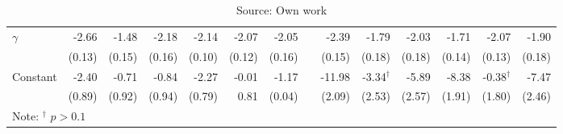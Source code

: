 \begin{table} [H]
\begin{tabular}{lrrrrrrrrrrrrr}
$\gamma$ & -2.66  & -1.48  & -2.18  & -2.14  & -2.07  & -2.05  && -2.39   & -1.79   & -2.03   & -1.71   & -2.07   & -1.90 \\ 
         & (0.13) & (0.15) & (0.16) & (0.10) & (0.12) & (0.16) && (0.15)  & (0.18)  & (0.18)  & (0.14)  & (0.13)  & (0.18) \\[0.07cm]
Constant & -2.40  & -0.71  & -0.84  & -2.27  & -0.01  & -1.17  && -11.98  & -3.34$^{\dagger}$   & -5.89   & -8.38   & -0.38$^{\dagger}$   & -7.47 \\ 
         & (0.89) & (0.92) & (0.94) & (0.79) & 0.81   & (0.04) && (2.09)  & (2.53)  & (2.57)  & (1.91)  & (1.80)  & (2.46) \\ 
\bottomrule
\multicolumn{3}{l}{Note: $^{\dagger}$ $p>0.1$}
\end{tabular}
\caption*{Source: Own work}
\end{table}

